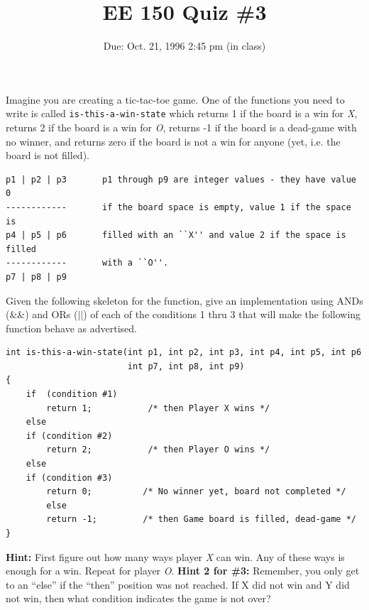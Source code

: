 \setcounter{page}{1}



\title{EE 150 Quiz \#3}
\author{Due: Oct. 21, 1996 2:45 pm (in class)}
\date{}
\maketitle

Imagine you are creating a tic-tac-toe game.  One of the functions you
need to write is called {\tt is-this-a-win-state} which returns 1 if
the board is a win for {\em X}, returns 2 if the board is a win for
{\em O}, returns -1 if the board is a dead-game with no winner, and
returns zero if the board is not a win for anyone (yet, i.e. the board
is not filled).

\begin{verbatim}
p1 | p2 | p3       p1 through p9 are integer values - they have value 0  
------------       if the board space is empty, value 1 if the space is
p4 | p5 | p6       filled with an ``X'' and value 2 if the space is filled
------------       with a ``O''.
p7 | p8 | p9
\end{verbatim}

Given the following skeleton for the function, give an implementation
using ANDs (\&\&) and ORs ($||$) of each of the conditions 1 thru 3
that will make the following function behave as advertised.
\begin{verbatim}
int is-this-a-win-state(int p1, int p2, int p3, int p4, int p5, int p6
                        int p7, int p8, int p9)
{
	if  (condition #1)
		return 1;           /* then Player X wins */
	else 
	if (condition #2)
		return 2;           /* then Player O wins */
	else
	if (condition #3)
		return 0;          /* No winner yet, board not completed */
        else	     	
		return -1;         /* then Game board is filled, dead-game */
}
\end{verbatim}

{\bf Hint:} First figure out how many ways player {\em X} can win. Any
of these ways is enough for a win.  Repeat for player {\em O}.
{\bf Hint 2 for \#3:} Remember, you only get to an ``else'' if the ``then'' 
position was not reached.  If X did not win and Y did not win, then
what condition indicates the game is not over?


